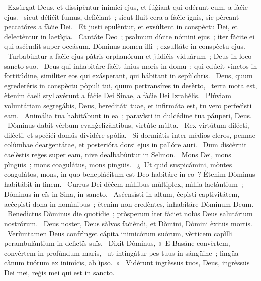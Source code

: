 \psalmChapterWithInscription{}
{ }
{%
~Exsùrgat Deus, et dissipèntur inimíci ejus, et fúġiant qui odérunt eum, a fàċie ejus. 
~sicut défiċit fumus, defìċiant~; sicut fluit cera a fàċie ìgnis, sic pèreant peccatóres a fàċie Dei. 
~Et justi epulèntur, et exsùltent in conspèctu Dei, et delectèntur in laetìçia. 
~Cantáte Deo~; psalmum dícite nómini ejus~; ìter fàċite ei qui asċèndit super occásum. Dòminus nomen illi~; exsultáte in conspèctu ejus. 
~Turbabùntur a fàċie ejus pàtris orphanórum et júdiċis viduárum~; Deus in loco sancto suo. 
~Deus qui inhabitáre fàċit únius moris in domu~; qui edúcit vinctos in fortitúdine, simìliter eos qui exásperant, qui hábitant in sepùlchrïs. 
~Deus, quum egrederéris in conspèctu pòpuli tui, quum pertransíres in desèrto, 
~terra mota est, ètenim ċaeli styllavérunt a fàċie Dei Sinae, a fàċie Dei Izrahélis. 
~Plúviam voluntáriam segregábis, Deus, hereditáti tuae, et infirmáta est, tu vero perfeċìsti eam. 
~Animália tua habitábunt in ea~; paravìsti in dulċédine tua páuperi, Deus. 
~Dòminus dabit vèrbum evanġelizàntibus, virtúte mùlta. 
~Rex virtútum dilécti, dilècti, et speċiéi domüs dividére spólia. 
~Si dormiátis inter mèdios cleros, pennae colùmbae dearġentátae, et posterióra dorsi ejus in pallóre auri. 
~Dum disċèrnit ċaelèstis reġes super eam, nive dealbabùntur in Selmon. 
~Mons Dei, mons pìngüis~; mons coagulátus, mons pingüis. 
~¿~Ut quid suspicámini, mòntes coagulátos, mons, in quo benepláċitum est Deo habitáre in eo~? Ètenim Dòminus habitábit in finem. 
~Currus Dei dèċem mìllibus mùltiplex, mìllia laetàntium~; Dòminus in eïs in Sina, in sancto. 
~Asċensìsti in altum, ċepìsti captivitátem, acċepìsti dona in homìnibus~; ètenim non credèntes, inhabitáre Dòminum Deum. 
~Benedìctus Dòminus die quotídie~; pròsperum ìter fàċiet nobïs Deus salutárium nostrórum. 
~Deus noster, Deus sàlvos faċièndi, et Dòmini, Dòmini èxitüs mortis. 
~Verùmtamen Deus confrìnget cápita inimicórum suórum, vèrticem capìlli perambulàntium in delìctïs suïs. 
~Dixit Dòminus, «~E Basáne convèrtem, convèrtem in profùndum maris, 
~ut intingátur pes tuus in sángüine~; lìngüa cànum tuórum ex inimícïs, ab ìpso.~»
~Vidérunt ingrèssüs tuos, Deus, ingrèssüs Dei mei, reġis mei qui est in sancto. 
}
